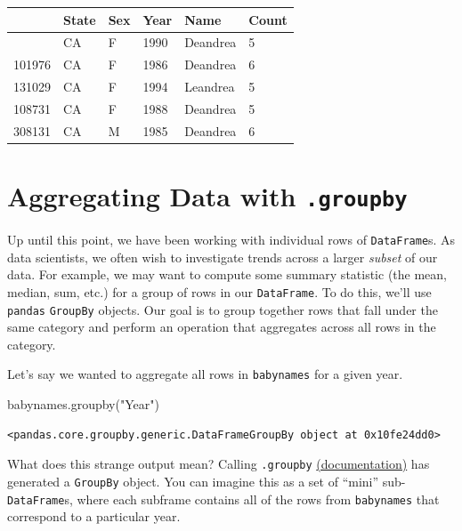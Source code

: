 \documentclass[
  letterpaper,
  DIV=11,
  numbers=noendperiod]{scrreprt}
\newenvironment{Shaded}{\begin{snugshade}}{\end{snugshade}}
\newcommand{\NormalTok}[1]{\textcolor[rgb]{0.00,0.23,0.31}{#1}}
\newcommand{\StringTok}[1]{\textcolor[rgb]{0.13,0.47,0.30}{#1}}
\begin{document}
\begin{longtable}[]{@{}llllll@{}}
\toprule\noalign{}
& State & Sex & Year & Name & Count \\
\midrule\noalign{}
\endhead
\bottomrule\noalign{}
\endlastfoot
115957 & CA & F & 1990 & Deandrea & 5 \\
101976 & CA & F & 1986 & Deandrea & 6 \\
131029 & CA & F & 1994 & Leandrea & 5 \\
108731 & CA & F & 1988 & Deandrea & 5 \\
308131 & CA & M & 1985 & Deandrea & 6 \\
\end{longtable}

\section{\texorpdfstring{Aggregating Data with
\texttt{.groupby}}{Aggregating Data with .groupby}}\label{aggregating-data-with-.groupby}

Up until this point, we have been working with individual rows of
\texttt{DataFrame}s. As data scientists, we often wish to investigate
trends across a larger \emph{subset} of our data. For example, we may
want to compute some summary statistic (the mean, median, sum, etc.) for
a group of rows in our \texttt{DataFrame}. To do this, we'll use
\texttt{pandas} \texttt{GroupBy} objects. Our goal is to group together
rows that fall under the same category and perform an operation that
aggregates across all rows in the category.

Let's say we wanted to aggregate all rows in \texttt{babynames} for a
given year.

\begin{Shaded}
\begin{Highlighting}[]
\NormalTok{babynames.groupby(}\StringTok{"Year"}\NormalTok{)}
\end{Highlighting}
\end{Shaded}

\begin{verbatim}
<pandas.core.groupby.generic.DataFrameGroupBy object at 0x10fe24dd0>
\end{verbatim}

What does this strange output mean? Calling \texttt{.groupby}
\href{https://pandas.pydata.org/pandas-docs/stable/reference/api/pandas.DataFrame.groupby.html}{(documentation)}
has generated a \texttt{GroupBy} object. You can imagine this as a set
of ``mini'' sub-\texttt{DataFrame}s, where each subframe contains all of
the rows from \texttt{babynames} that correspond to a particular year.
\end{document}
